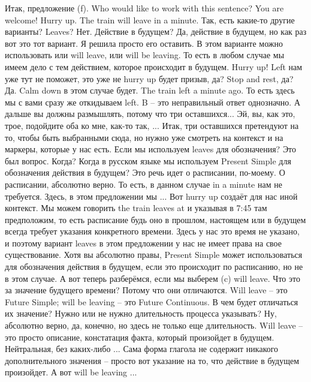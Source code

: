 \documentclass[main.tex]{subfiles}
\begin{document}
Итак, предложение (f).
Who would like to work with this sentence?
You are welcome!
Hurry up. The train will leave in a minute.
Так, есть какие-то другие варианты?
Leaves?
Нет.
Действие в будущем?
Да, действие в будущем, но как раз вот это тот вариант.
Я решила просто его оставить.
В этом варианте можно использовать или will leave, или will be leaving.
То есть в любом случае мы имеем дело с тем действием, которое происходит в будущем.
Hurry up! Left нам уже тут не поможет, это уже не hurry up будет призыв, да?
Stop and rest, да?
Да.
Calm down в этом случае будет.
The train left a minute ago.
То есть здесь мы с вами сразу же откидываем left.
B -- это неправильный ответ однозначно.
А дальше вы должны размышлять, потому что три оставшихся...
Эй, вы, как это, трое, подойдите оба ко мне, как-то так, ...
Итак, три оставшихся претендуют на то, чтобы быть выбранными сюда, но нужно уже смотреть на контекст и на маркеры, которые у нас есть.
Если мы используем leaves для обозначения?
Это был вопрос.
Когда?
Когда в русском языке мы используем Present Simple для обозначения действия в будущем?
Это речь идет о расписании, по-моему.
О расписании, абсолютно верно.
То есть, в данном случае in a minute нам не требуется.
Здесь, в этом предложении мы ...
Вот hurry up создаёт для нас иной контекст.
Мы можем говорить the train leaves at и указывая в 7:45 там предположим, то есть расписание будь оно в прошлом, настоящем или в будущем всегда требует указания конкретного времени.
Здесь у нас это время не указано, и поэтому вариант leaves в этом предложении у нас не имеет права на свое существование.
Хотя вы абсолютно правы, Present Simple может использоваться для обозначения действия в будущем, если это происходит по расписанию, но не в этом случае.
А вот теперь разберёмся, если мы выберем (c) will leave.
Что это за значение будущего времени?
Потому что они отличаются.
Will leave -- это Future Simple; will be leaving -- это Future Continuous.
В чем будет отличаться их значение?
Нужно или не нужно длительность процесса указывать?
Ну, абсолютно верно, да, конечно, но здесь не только еще длительность.
Will leave -- это просто описание, констатация факта, который произойдет в будущем.
Нейтральная, без каких-либо ...
Сама форма глагола не содержит никакого дополнительного значения -- просто вот указание на то, что действие в будущем произойдет.
А вот will be leaving ...
\end{document}
